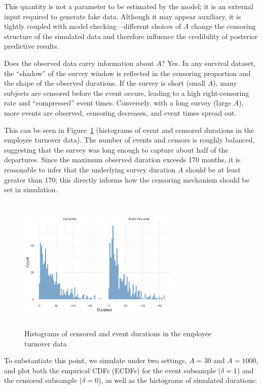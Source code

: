 This quantity is not a parameter to be estimated by the model; it is an external input required to generate fake data. Although it may appear auxiliary, it is tightly coupled with model checking—different choices of $A$ change the censoring structure of the simulated data and therefore influence the credibility of posterior predictive results.

Does the observed data carry information about $A$? Yes. In any survival dataset, the “shadow” of the survey window is reflected in the censoring proportion and the shape of the observed durations. If the survey is short (small $A$), many subjects are censored before the event occurs, leading to a high right-censoring rate and “compressed” event times. Conversely, with a long survey (large $A$), more events are observed, censoring decreases, and event times spread out.

This can be seen in Figure~\ref{fig:离职数据分开的直方图} (histograms of event and censored durations in the employee turnover data). The number of events and censors is roughly balanced, suggesting that the survey was long enough to capture about half of the departures. Since the maximum observed duration exceeds 170 months, it is reasonable to infer that the underlying survey duration $A$ should be at least greater than 170; this directly informs how the censoring mechanism should be set in simulation.
\begin{figure}[H]
    \centering
    \includegraphics[height=6.5cm, width=0.7\textwidth]{images/separate_hist.png}
    \caption{Histograms of censored and event durations in the employee turnover data}
    \label{fig:离职数据分开的直方图}
\end{figure}

To substantiate this point, we simulate under two settings, $A=30$ and $A=1000$, and plot both the empirical CDFs (ECDFs) for the event subsample ($\delta=1$) and the censored subsample ($\delta=0$), as well as the histograms of simulated durations:


